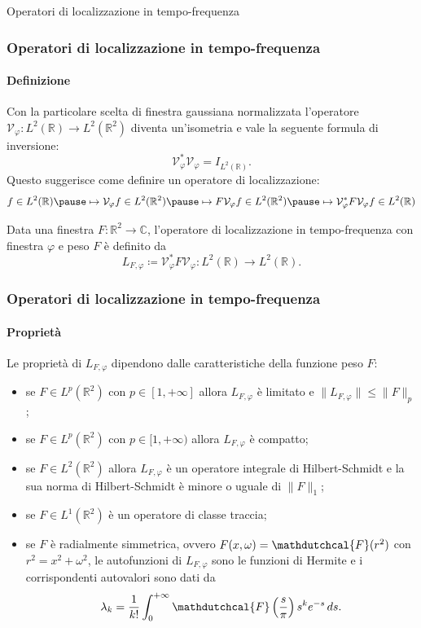 \documentclass[aspectratio=141]{beamer}
\newcommand{\R}{\mathbb{R}} %
\newcommand{\V}{\mathcal{V}} %
\newcommand{\C}{\mathbb{C}} %
\begin{document}
\begin{section}{Operatori di localizzazione in tempo-frequenza}
	
	\begin{frame}
		\frametitle{Operatori di localizzazione in tempo-frequenza}
		\framesubtitle{Definizione}
		Con la particolare scelta di finestra gaussiana normalizzata l'operatore $\V_{\varphi} : L^2(\R) \rightarrow L^2(\R^2)$ diventa un'isometria e vale la seguente formula di inversione:
		\begin{equation*}
			\V_{\varphi}^* \V_{\varphi} = I_{L^2(\R)}.
		\end{equation*}
		\pause
		Questo suggerisce come definire un operatore di localizzazione:
		\begin{equation*}
			f \in L^2(\R) \pause \mapsto \V_{\varphi} f \in L^2(\R^2) \pause \mapsto F \V_{\varphi} f \in L^2(\R^2) \pause \mapsto \V_{\varphi}^* F \V_{\varphi} f \in L^2(\R)
		\end{equation*}
		\onslide<5-> \begin{myblock}
			Data una finestra $F: \R^2 \rightarrow \C$, l'operatore di localizzazione in tempo-frequenza con finestra $\varphi$ e peso $F$ è definito da
			\begin{equation*}
				L_{F,\varphi} \coloneqq \V_{\varphi}^* F \V_{\varphi} : L^2(\R) \rightarrow L^2(\R).
			\end{equation*}
		\end{myblock}
	\end{frame}

	\begin{frame}
		\frametitle{Operatori di localizzazione in tempo-frequenza}
		\framesubtitle{Proprietà}
		Le proprietà di $L_{F,\varphi}$ dipendono dalle caratteristiche della funzione peso $F$:
		\begin{itemize}
			\item se $F \in L^p (\R^2)$ con $p \in [1,+\infty]$ allora $L_{F,\varphi}$ è limitato e $\|L_{F,\varphi}\| \leq \|F\|_p$; \pause
			\item se $F \in L^p (\R^2)$ con $p \in [1,+\infty)$ allora $L_{F,\varphi}$ è compatto;\pause
			\item se $F \in L^2(\R^2)$ allora $L_{F,\varphi}$ è un operatore integrale di Hilbert-Schmidt e la sua norma di Hilbert-Schmidt è minore o uguale di $\|F\|_1$;\pause
			\item se $F \in L^1(\R^2)$ è un operatore di classe traccia;\pause
			\item se $F$ è radialmente simmetrica, ovvero $F(x,\omega) = \mathdutchcal{F}(r^2)$ con $r^2 = x^2 + \omega^2$, le autofunzioni di $L_{F,\varphi}$ sono le funzioni di Hermite e i corrispondenti autovalori sono dati da
			\begin{equation*}
				\lambda_k = \dfrac{1}{k!} \int_0^{+\infty} \mathdutchcal{F}\left(\dfrac{s}{\pi}\right) s^k e^{-s} \, ds.
			\end{equation*}
		\end{itemize}
	\end{frame}
\end{section}
\end{document}
